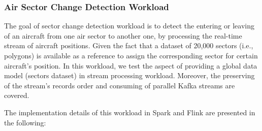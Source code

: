 \documentclass[]{article}
\begin{document}
\subsubsection{Air Sector Change Detection Workload}
\label{sec:sectors}
The goal of sector change detection workload is to detect the  entering or leaving of an aircraft from one air sector to another one, by processing the real-time stream of aircraft positions. Given the fact that a dataset of 20,000 sectors (i.e., polygons) is available as a reference to assign the corresponding sector for certain aircraft's position. In this workload, we test the aspect of providing a global data model (sectors dataset) in stream processing workload. Moreover, the preserving of the stream's records order and consuming of parallel Kafka streams  are covered.
 
 The implementation details of this workload in Spark and Flink are presented in the following: 
 
\end{document}
